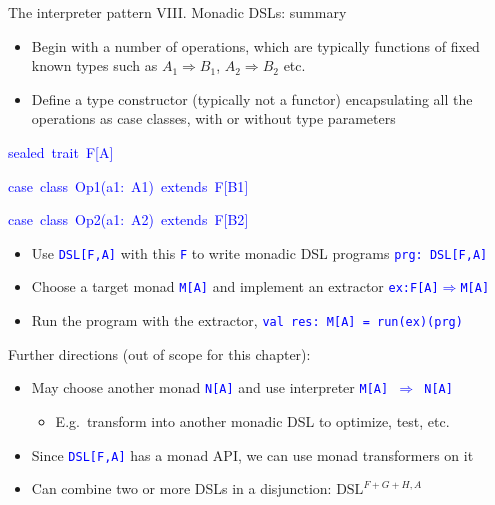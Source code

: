\documentclass[english,,russian]{beamer}
\newenvironment{lyxcode}
  {\par\begin{list}{}{
    \setlength{\rightmargin}{\leftmargin}
    \setlength{\listparindent}{0pt}%
    \raggedright
    \setlength{\itemsep}{0pt}
    \setlength{\parsep}{0pt}
    \normalfont\ttfamily}%
   \def\{{\char`\{}
   \def\}{\char`\}}
   \def\textasciitilde{\char`\~}
   \item[]}
  {\end{list}}
\begin{document}
\begin{frame}{The interpreter pattern VIII. Monadic DSLs: summary}
\begin{itemize}
\item \vspace{-0.15cm}Begin with a number of operations, which are typically
functions of fixed known types such as $A_{1}\Rightarrow B_{1}$,
$A_{2}\Rightarrow B_{2}$ etc.
\item Define a type constructor (typically not a functor) encapsulating
all the operations as case classes, with or without type parameters
\end{itemize}
\begin{lyxcode}
\textcolor{blue}{\footnotesize{}sealed~trait~F{[}A{]}}{\footnotesize\par}

\textcolor{blue}{\footnotesize{}case~class~Op1(a1:~A1)~extends~F{[}B1{]}}{\footnotesize\par}

\textcolor{blue}{\footnotesize{}case~class~Op2(a1:~A2)~extends~F{[}B2{]}}{\footnotesize\par}
\end{lyxcode}
\begin{itemize}
\item Use \texttt{\textcolor{blue}{\footnotesize{}DSL{[}F,A{]}}} with this
\texttt{\textcolor{blue}{\footnotesize{}F}} to write monadic DSL programs
\texttt{\textcolor{blue}{\footnotesize{}prg:~DSL{[}F,A{]}}} 
\item Choose a target monad \texttt{\textcolor{blue}{\footnotesize{}M{[}A{]}}}
and implement an extractor \texttt{\textcolor{blue}{\footnotesize{}ex:F{[}A{]}$\Rightarrow$M{[}A{]}}} 
\item Run the program with the extractor, \texttt{\textcolor{blue}{\footnotesize{}val
res:~M{[}A{]} = run(ex)(prg)}} 
\end{itemize}
Further directions (out of scope for this chapter):
\begin{itemize}
\item May choose another monad \texttt{\textcolor{blue}{\footnotesize{}N{[}A{]}}}
and use interpreter \texttt{\textcolor{blue}{\footnotesize{}M{[}A{]}
$\Rightarrow$ N{[}A{]}}} 
\begin{itemize}
\item E.g.~transform into another monadic DSL to optimize, test, etc.
\end{itemize}
\item Since \texttt{\textcolor{blue}{\footnotesize{}DSL{[}F,A{]}}} has a
monad API, we can use monad transformers on it
\item Can combine two or more DSLs in a disjunction: $\text{DSL}^{F+G+H,A}$
\end{itemize}
\end{frame}
\end{document}

